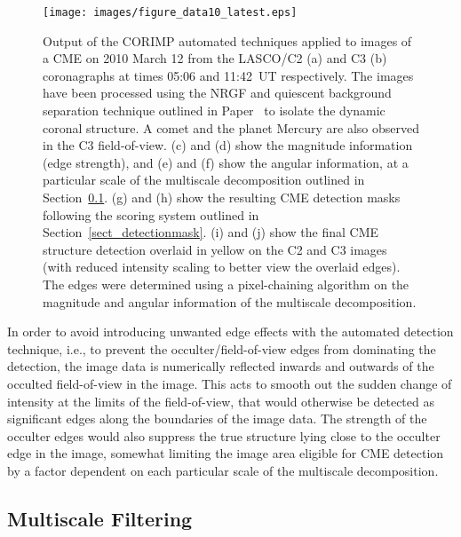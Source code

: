 \documentclass[preprint2]{aastex}
\newcommand{\RNum}[1]{\uppercase\expandafter{\romannumeral #1\relax}}
\begin{document}
\begin{figure}[!p]
\centerline{\texttt{[image: images/figure\_data10\_latest.eps]}}
\caption{Output of the CORIMP automated techniques applied to images of a CME on 2010 March 12 from the LASCO/C2 (a) and C3 (b) coronagraphs at times 05:06 and 11:42~UT respectively. The images have been processed using the NRGF and quiescent background separation technique outlined in Paper~\RNum{1} to isolate the dynamic coronal structure. A comet and the planet Mercury are also observed in the C3 field-of-view. (c) and (d) show the magnitude information (edge strength), and (e) and (f) show the angular information, at a particular scale of the multiscale decomposition outlined in Section~\ref{sect_multiscale}. (g) and (h) show the resulting CME detection masks following the scoring system outlined in Section~\ref{sect_detectionmask}. (i) and (j) show the final CME structure detection overlaid in yellow on the C2 and C3 images (with reduced intensity scaling to better view the overlaid edges). The edges were determined using a pixel-chaining algorithm on the magnitude and angular information of the multiscale decomposition.}
\label{figure_data10}
\end{figure}

In order to avoid introducing unwanted edge effects with the automated detection technique, i.e., to prevent the occulter/field-of-view edges from dominating the detection, the image data is numerically reflected inwards and outwards of the occulted field-of-view in the image. This acts to smooth out the sudden change of intensity at the limits of the field-of-view, that would otherwise be detected as significant edges along the boundaries of the image data. The strength of the occulter edges would also suppress the true structure lying close to the occulter edge in the image, somewhat limiting the image area eligible for CME detection by a factor dependent on each particular scale of the multiscale decomposition.

\subsection{Multiscale Filtering}
\label{sect_multiscale}
\end{document}
